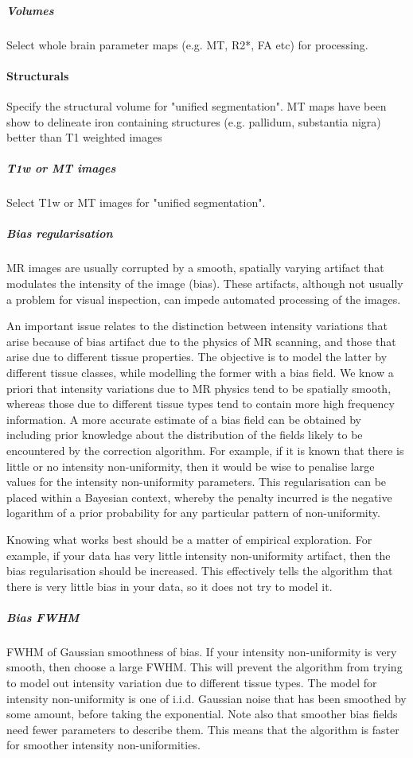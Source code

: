 \subparagraph{Volumes}
Select whole brain parameter maps (e.g. MT, R2*, FA etc) for processing.


\paragraph{Structurals}
Specify the structural volume for "unified segmentation". MT maps have been show to delineate iron containing structures (e.g. pallidum, substantia nigra) better than T1 weighted images


\subparagraph{T1w or MT images}
Select T1w or MT images for "unified segmentation".


\subparagraph{Bias regularisation}
MR images are usually corrupted by a smooth, spatially varying artifact that modulates the intensity of the image (bias). These artifacts, although not usually a problem for visual inspection, can impede automated processing of the images.



An important issue relates to the distinction between intensity variations that arise because of bias artifact due to the physics of MR scanning, and those that arise due to different tissue properties.  The objective is to model the latter by different tissue classes, while modelling the former with a bias field. We know a priori that intensity variations due to MR physics tend to be spatially smooth, whereas those due to different tissue types tend to contain more high frequency information. A more accurate estimate of a bias field can be obtained by including prior knowledge about the distribution of the fields likely to be encountered by the correction algorithm. For example, if it is known that there is little or no intensity non-uniformity, then it would be wise to penalise large values for the intensity non-uniformity parameters. This regularisation can be placed within a Bayesian context, whereby the penalty incurred is the negative logarithm of a prior probability for any particular pattern of non-uniformity.

Knowing what works best should be a matter of empirical exploration.  For example, if your data has very little intensity non-uniformity artifact, then the bias regularisation should be increased.  This effectively tells the algorithm that there is very little bias in your data, so it does not try to model it.


\subparagraph{Bias FWHM}
FWHM of Gaussian smoothness of bias. If your intensity non-uniformity is very smooth, then choose a large FWHM. This will prevent the algorithm from trying to model out intensity variation due to different tissue types. The model for intensity non-uniformity is one of i.i.d. Gaussian noise that has been smoothed by some amount, before taking the exponential. Note also that smoother bias fields need fewer parameters to describe them. This means that the algorithm is faster for smoother intensity non-uniformities.


